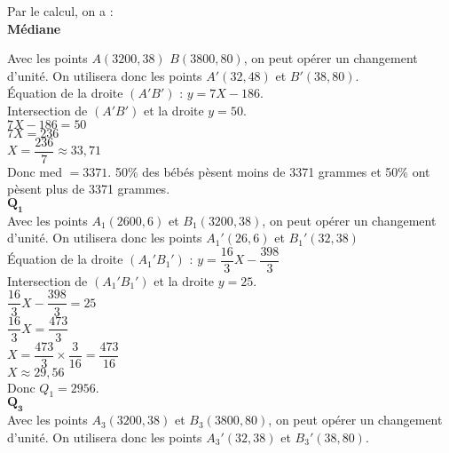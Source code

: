 \vspace*{.3cm}

Par le calcul, on a : \\

\textbf{Médiane}

Avec les points $A(3200,38)$ $ B(3800,80)$, on peut opérer un changement d'unité. On utilisera donc les points $A'(32,48)$ et $B'(38,80)$. \\

Équation de la droite $(A'B')$ : $y=7X - 186$. \\

Intersection de $(A'B')$ et la droite $y=50$. \\

$7X - 186  = 50$ \\

$ 7X = 236$ \\

$ X = \dfrac{236}{7} \approx 33,71 $ \\

Donc med $= 3371$. 50\% des bébés pèsent moins de 3371 grammes et 50\% ont pèsent plus de 3371 grammes. \\

$\mathbf{Q_1}$  \\

Avec les points $A_1(2600,6)$ et $B_1(3200,38)$, on peut opérer un changement d'unité. On utilisera donc les points $A_1'(26,6)$ et $B_1'(32,38)$  \\

Équation de la droite $(A_1'B_1')$ : $y=\dfrac{16}{3}X - \dfrac{398}{3}$ \\

Intersection de $(A_1'B_1')$ et la droite $y=25$. \\

$ \dfrac{16}{3}X - \dfrac{398}{3} = 25$ \\

$ \dfrac{16}{3}X = \dfrac{473}{3} $ \\

$ X = \dfrac{473}{3} \times \dfrac{3}{16} = \dfrac{473}{16} $ \\

$ X \approx 29,56 $ \\

Donc $Q_1 = 2956$. \\

$\mathbf{Q_3}$ \\

Avec les points $A_3(3200,38)$ et $B_3(3800,80)$, on peut opérer un changement d'unité. On utilisera donc les points $A_3'(32,38)$ et $ B_3'(38,80)$. \\

